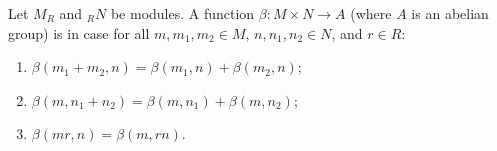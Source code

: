Let $M_R$ and ${}_R N$ be modules. A function $\beta: M \times N \to A$ (where $A$ is an abelian group) is  in case for all $m, m_1, m_2 \in M$, $n, n_1, n_2 \in N$, and $r \in R$:
\begin{enumerate}
\item[(1)] $\beta(m_1 + m_2, n) = \beta(m_1, n) + \beta(m_2, n)$;
\item[(2)] $\beta(m, n_1 + n_2) = \beta(m, n_1) + \beta(m, n_2)$;
\item[(3)] $\beta(mr, n) = \beta(m, rn)$.
\end{enumerate}
